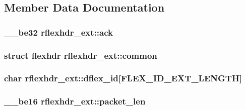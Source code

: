 \subsection{Member Data Documentation}
\subsubsection[{\texorpdfstring{ack}{ack}}]{\setlength{\rightskip}{0pt plus 5cm}\+\_\+\+\_\+be32 rflexhdr\+\_\+ext\+::ack}\hypertarget{structrflexhdr__ext_aee0018851d2f3381fd99c405606731b4}{}\label{structrflexhdr__ext_aee0018851d2f3381fd99c405606731b4}
\subsubsection[{\texorpdfstring{common}{common}}]{\setlength{\rightskip}{0pt plus 5cm}struct {\bf flexhdr} rflexhdr\+\_\+ext\+::common}\hypertarget{structrflexhdr__ext_ac57a5553651d7cdde22b2d00c0a916ce}{}\label{structrflexhdr__ext_ac57a5553651d7cdde22b2d00c0a916ce}
\subsubsection[{\texorpdfstring{dflex\+\_\+id}{dflex_id}}]{\setlength{\rightskip}{0pt plus 5cm}char rflexhdr\+\_\+ext\+::dflex\+\_\+id\mbox{[}{\bf F\+L\+E\+X\+\_\+\+I\+D\+\_\+\+E\+X\+T\+\_\+\+L\+E\+N\+G\+TH}\mbox{]}}\hypertarget{structrflexhdr__ext_a3e35c1161803908776955800eb2ad3fe}{}\label{structrflexhdr__ext_a3e35c1161803908776955800eb2ad3fe}
\subsubsection[{\texorpdfstring{packet\+\_\+len}{packet_len}}]{\setlength{\rightskip}{0pt plus 5cm}\+\_\+\+\_\+be16 rflexhdr\+\_\+ext\+::packet\+\_\+len}\hypertarget{structrflexhdr__ext_ac716297c579ced38da559cf53967f09b}{}\label{structrflexhdr__ext_ac716297c579ced38da559cf53967f09b}
